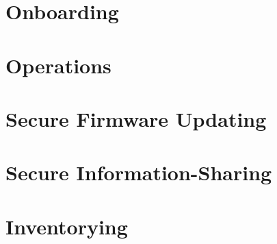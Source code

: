 \section{Onboarding} %
\label{sec:Onboarding}


\section{Operations} %
\label{sec:Operations}


\section{Secure Firmware Updating} %
\label{sec:Secure Firmware Updating}


\section{Secure Information-Sharing} %
\label{sec:Secure Information-Sharing}


\section{Inventorying} %
\label{sec:Inventorying}

